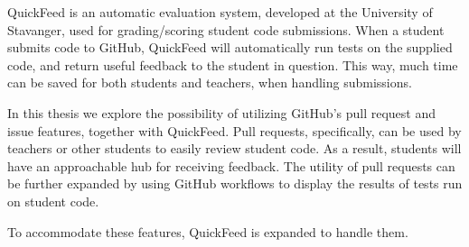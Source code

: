 
\abstract

QuickFeed is an automatic evaluation system, developed at the University of Stavanger, used for grading/scoring student code submissions. 
When a student submits code to GitHub, QuickFeed will automatically run tests on the supplied code, and return useful feedback to the student in question.
This way, much time can be saved for both students and teachers, when handling submissions.

In this thesis we explore the possibility of utilizing GitHub's pull request and issue features, together with QuickFeed.
Pull requests, specifically, can be used by teachers or other students to easily review student code.
As a result, students will have an approachable hub for receiving feedback.
The utility of pull requests can be further expanded by using GitHub workflows to display the results of tests run on student code.

To accommodate these features, QuickFeed is expanded to handle them.
